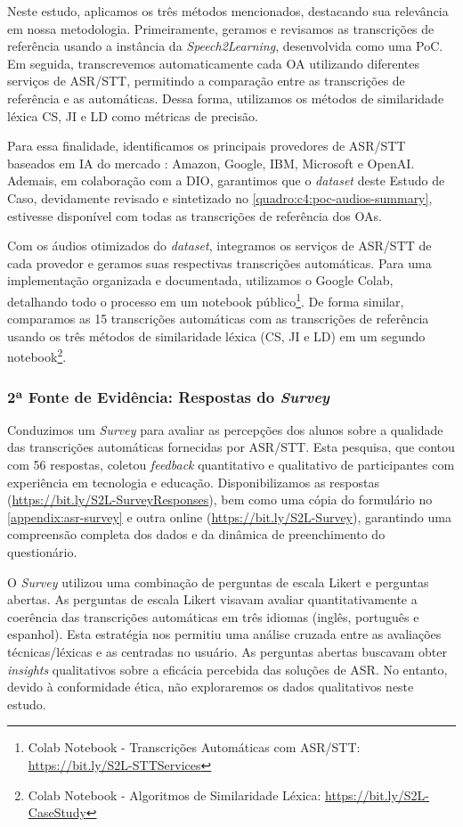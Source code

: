 Neste estudo, aplicamos os três métodos mencionados, destacando sua relevância em nossa metodologia. Primeiramente, geramos e revisamos as transcrições de referência usando a instância da \textit{Speech2Learning}, desenvolvida como uma PoC. Em seguida, transcrevemos automaticamente cada OA utilizando diferentes serviços de ASR/STT, permitindo a comparação entre as transcrições de referência e as automáticas. Dessa forma, utilizamos os métodos de similaridade léxica CS, JI e LD como métricas de precisão.

Para essa finalidade, identificamos os principais provedores de ASR/STT baseados em IA do mercado \cite{Gartner2023}: Amazon, Google, IBM, Microsoft e OpenAI. Ademais, em colaboração com a DIO, garantimos que o \textit{dataset} deste Estudo de Caso, devidamente revisado e sintetizado no \autoref{quadro:c4:poc-audios-summary}, estivesse disponível com todas as transcrições de referência dos OAs.

Com os áudios otimizados do \textit{dataset}, integramos os serviços de ASR/STT de cada provedor e geramos suas respectivas transcrições automáticas. Para uma implementação organizada e documentada, utilizamos o Google Colab, detalhando todo o processo em um notebook público\footnote{Colab Notebook - Transcrições Automáticas com ASR/STT: \url{https://bit.ly/S2L-STTServices}}. De forma similar, comparamos as 15 transcrições automáticas com as transcrições de referência usando os três métodos de similaridade léxica (CS, JI e LD) em um segundo notebook\footnote{Colab Notebook - Algoritmos de Similaridade Léxica: \url{https://bit.ly/S2L-CaseStudy}}.

\subsubsection{2ª Fonte de Evidência: Respostas do \textit{Survey}}

Conduzimos um \textit{Survey} para avaliar as percepções dos alunos sobre a qualidade das transcrições automáticas fornecidas por ASR/STT. Esta pesquisa, que contou com 56 respostas, coletou \textit{feedback} quantitativo e qualitativo de participantes com experiência em tecnologia e educação. Disponibilizamos as respostas (\url{https://bit.ly/S2L-SurveyResponses}), bem como uma cópia do formulário no \autoref{appendix:asr-survey} e outra online (\url{https://bit.ly/S2L-Survey}), garantindo uma compreensão completa dos dados e da dinâmica de preenchimento do questionário.

O \textit{Survey} utilizou uma combinação de perguntas de escala Likert e perguntas abertas. As perguntas de escala Likert visavam avaliar quantitativamente a coerência das transcrições automáticas em três idiomas (inglês, português e espanhol). Esta estratégia nos permitiu uma análise cruzada entre as avaliações técnicas/léxicas e as centradas no usuário. As perguntas abertas buscavam obter \textit{insights} qualitativos sobre a eficácia percebida das soluções de ASR. No entanto, devido à conformidade ética, não exploraremos os dados qualitativos neste estudo.

